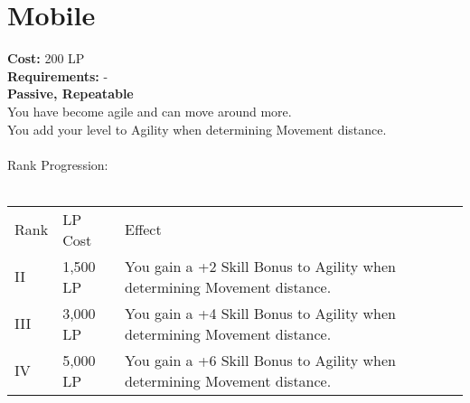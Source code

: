 \section{Mobile}\label{perk:mobile}
\textbf{Cost:} 200 LP\\
\textbf{Requirements:} -\\
\textbf{Passive, Repeatable}\\
You have become agile and can move around more.\\
You add your level to Agility when determining Movement distance.\\
\\
Rank Progression:\\
\\
\begin{longtable}{l | l | p{9cm}}
	Rank & LP Cost & Effect\\
	II & 1,500 LP & You gain a +2 Skill Bonus to Agility when determining Movement distance.\\
	III & 3,000 LP & You gain a +4 Skill Bonus to Agility when determining Movement distance.\\
	IV & 5,000 LP & You gain a +6 Skill Bonus to Agility when determining Movement distance.\\
\end{longtable}
